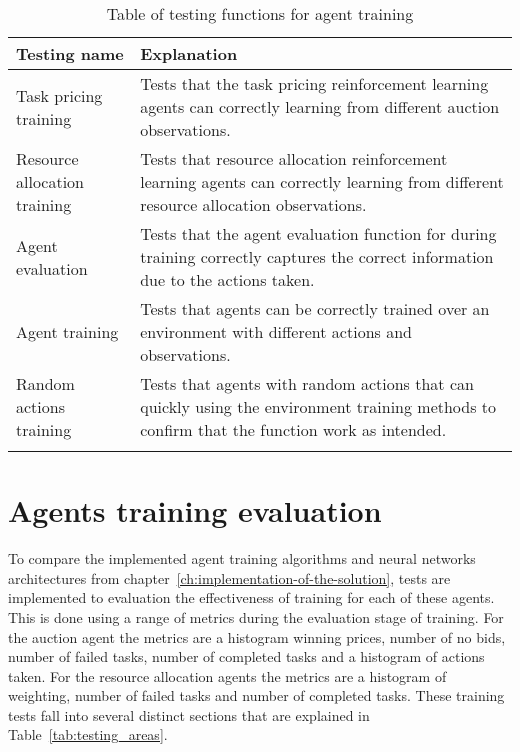 \begin{longtable}{|p{3cm}|p{11cm}|} \hline
    \textbf{Testing name} & \textbf{Explanation} \\ \hline
    Task pricing training & Tests that the task pricing reinforcement learning agents can correctly learning from
        different auction observations. \\ \hline
    Resource allocation training & Tests that resource allocation reinforcement learning agents can correctly
        learning from different resource allocation observations. \\ \hline
    Agent evaluation & Tests that the agent evaluation function for during training correctly captures the correct
        information due to the actions taken. \\ \hline
    Agent training & Tests that agents can be correctly trained over an environment with different actions and
        observations. \\ \hline
    Random actions training & Tests that agents with random actions that can quickly using the environment training
        methods to confirm that the function work as intended. \\ \hline
    \caption{Table of testing functions for agent training}
    \label{tab:training_testing}
\end{longtable}

\section{Agents training evaluation}\label{sec:evaluation-testing}
To compare the implemented agent training algorithms and neural networks architectures from
chapter~\ref{ch:implementation-of-the-solution}, tests are implemented to evaluation the effectiveness of training for
each of these agents. This is done using a range of metrics during the evaluation stage of training. For the
auction agent the metrics are a histogram winning prices, number of no bids, number of failed tasks, number of completed
tasks and a histogram of actions taken. For the resource allocation agents the metrics are a histogram of weighting,
number of failed tasks and number of completed tasks. These training tests fall into several distinct sections that are
explained in Table~\ref{tab:testing_areas}.


